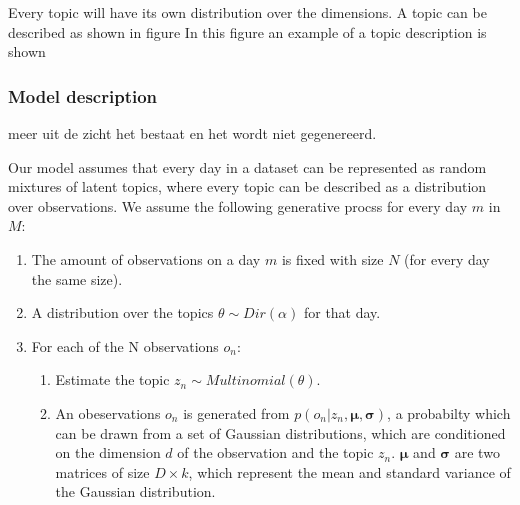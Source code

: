 \documentclass[11pt,a4paper]{article}
\begin{document}
Every topic will have its own distribution over the dimensions. A
topic can be described as shown in figure %
In this figure an example of a topic description is shown

  \subsubsection{Model description}
   meer uit de zicht het bestaat en het wordt niet gegenereerd.
  
  Our model assumes that every day in a dataset can be represented as random mixtures of latent topics, where every topic can be described as a distribution over observations. We assume the following generative procss for every day $m$ in $M$:
\begin{enumerate}
 \item The amount of observations on a day $m$ is fixed with size $N$ (for every day the same size).
 \item A distribution over the topics $\theta \sim Dir(\alpha)$ for that day.
 \item For each of the N observations $o_n$:
 
 \begin{enumerate}
  \item Estimate the topic $z_n \sim Multinomial(\theta)$.
  \item An obeservations $o_n$ is generated from $p(o_n |z_n,\boldsymbol\mu,\boldsymbol\sigma)$, a probabilty which can be drawn from a set of Gaussian distributions, which are conditioned on the dimension $d$ of the observation and the topic $z_n$. $\boldsymbol\mu$ and $\boldsymbol\sigma$ are two matrices of size  $D\times k$, which represent the mean and standard variance of the Gaussian distribution.
 \end{enumerate}

\end{enumerate}
  
\end{document}
